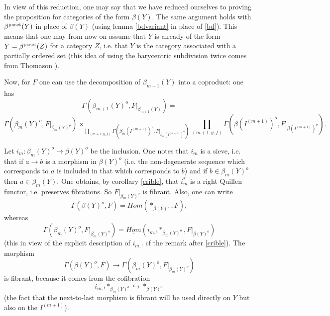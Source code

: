 In view of this reduction, one may say that we have reduced ourselves to
proving the
proposition for categories of the form $\beta (Y)$. The same argument
holds with $\beta^{\rm poset}(Y)$ in place of $\beta (Y)$ (using
lemma \ref{bdvariant} in place of \ref{bd}). This means that one may
from now on assume that $Y$ is already of the form  $Y= \beta^{\rm
poset}(Z)$
for a category $Z$, i.e. that $Y$ is the category associated with a
partially ordered set (this idea of using the barycentric
subdivision twice comes from Thomason \cite{ThomasonCatMod}).

Now, for $F$ one can use the decomposition of $\beta _{m+1}(Y)$ into a
coproduct: one has
$$
\Gamma (\beta _{m+1}(Y)^o, F|_{\beta _{m+1}(Y)})=
$$
$$
\Gamma (\beta _m(Y)^o, F|_{\beta _{m}(Y)^o}) \times
_{\prod _{(m+1; y,f)}\Gamma (\beta _m(I^{(m+1)})^o, F|_{\beta
_{m}(I^{(m+1)})^o})}
\prod _{(m+1; y,f)}\Gamma (\beta (I^{(m+1)})^o, F|_{\beta (I^{(m+1)})^o}).
$$

Let $i_m: \beta_m (Y)^o\rightarrow \beta (Y)^o$ be the inclusion. One notes
that
$i_m$ is a sieve, i.e. that if
$a\rightarrow b$ is a morphism in $\beta (Y)^o$ (i.e. the
non-degenerate sequence which corresponds to $a$ is included in that which
corresponds to $b$) and if $b\in \beta _m(Y)^o$ then $a\in \beta _m(Y)$. One
obtains, by corollary \ref{crible}, that $i_m^{\ast}$ is a
right Quillen functor, i.e. preserves fibrations. So $F|_{\beta
_m(Y)^o}$ is
fibrant. Also, one can write
$$
\Gamma (\beta (Y)^o, F) =
\underline{Hom}(\ast_{\beta (Y)^o}, F),
$$
whereas
$$
\Gamma (\beta _m(Y)^o, F|_{\beta _m(Y)^o}) = \underline{Hom}(i_{m,!}\ast_{\beta
_m(Y)^o}, F|_{\beta (Y)^o})
$$
(this in view of the explicit description of $i_{m,!}$ cf the remark
after \ref{crible}). The morphism
$$
\Gamma (\beta (Y)^o, F)
\rightarrow
\Gamma (\beta _m(Y)^o, F|_{\beta _m(Y)^o})
$$
is fibrant, because it
comes from the cofibration
$$
i_{m,!}\ast_{\beta
_m(Y)^o}\hookrightarrow \ast _{\beta (Y)^o}
$$
(the fact that the next-to-last morphism is fibrant will be used
directly on $Y$ but also on the $I^{(m+1)}$).

